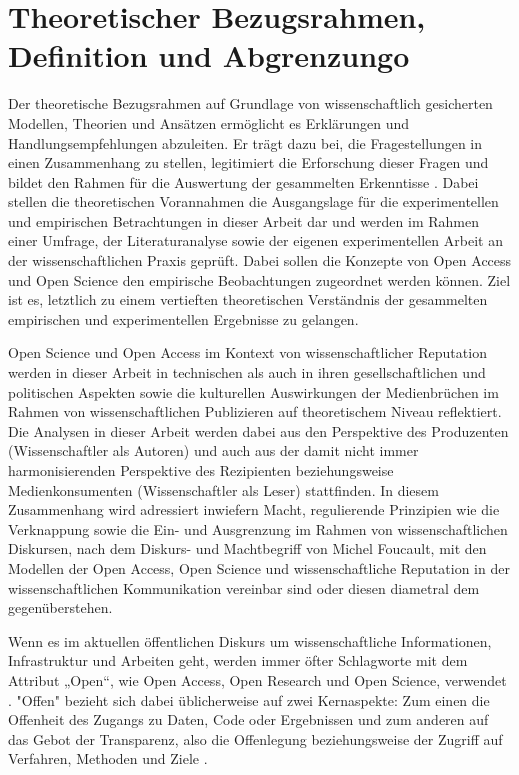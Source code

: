 \chapter{Theoretischer Bezugsrahmen, Definition und Abgrenzungo} 

Der theoretische Bezugsrahmen auf Grundlage von wissenschaftlich gesicherten Modellen, Theorien und Ansätzen ermöglicht es Erklärungen und Handlungsempfehlungen abzuleiten\cite{martin_2007_wissenschaftstheorie}. Er trägt dazu bei, die Fragestellungen in einen Zusammenhang zu stellen, legitimiert die Erforschung dieser Fragen und bildet den Rahmen für die Auswertung der gesammelten Erkenntisse \cite{suchen}. Dabei stellen die theoretischen Vorannahmen die Ausgangslage für die experimentellen und empirischen Betrachtungen in dieser Arbeit dar und werden im Rahmen einer Umfrage, der Literaturanalyse sowie der eigenen experimentellen Arbeit an der wissenschaftlichen Praxis geprüft. Dabei sollen die Konzepte von Open Access und Open Science den empirische Beobachtungen zugeordnet werden können. Ziel ist es, letztlich zu einem vertieften theoretischen Verständnis der gesammelten empirischen und experimentellen Ergebnisse zu gelangen. 

Open Science und Open Access im Kontext von wissenschaftlicher Reputation werden in dieser Arbeit in technischen als auch in ihren gesellschaftlichen und politischen Aspekten sowie die kulturellen Auswirkungen der Medienbrüchen im Rahmen von wissenschaftlichen Publizieren auf theoretischem Niveau reflektiert. Die Analysen in dieser Arbeit werden dabei aus den Perspektive des Produzenten (Wissenschaftler als Autoren) und auch aus der damit nicht immer harmonisierenden Perspektive des Rezipienten beziehungsweise Medienkonsumenten (Wissenschaftler als Leser) stattfinden. In diesem Zusammenhang wird adressiert inwiefern Macht, regulierende Prinzipien wie die Verknappung sowie die Ein- und Ausgrenzung im Rahmen von wissenschaftlichen Diskursen, nach dem Diskurs- und Machtbegriff von Michel Foucault, mit den Modellen der Open Access, Open Science und wissenschaftliche Reputation in der wissenschaftlichen Kommunikation vereinbar sind oder diesen diametral dem gegenüberstehen. 

Wenn es im aktuellen öffentlichen Diskurs um wissenschaftliche Informationen, Infrastruktur und Arbeiten geht, werden immer öfter Schlagworte mit dem Attribut „Open“, wie Open Access, Open Research und Open Science, verwendet \cite{bunz_2014} \cite{schulze_2013_open}. "Offen" bezieht sich dabei üblicherweise auf zwei Kernaspekte: Zum einen die Offenheit des Zugangs zu Daten, Code oder Ergebnissen und zum anderen auf das Gebot der Transparenz, also die Offenlegung beziehungsweise der Zugriff auf Verfahren, Methoden und Ziele \cite{schulze_2013_open}.

